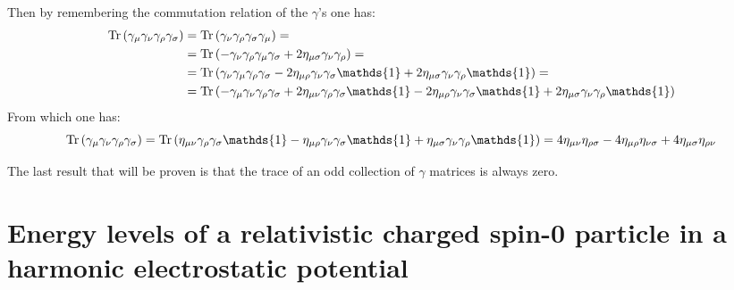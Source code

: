 \documentclass[11pt, oneside]{article}   	%
\begin{document}
Then by remembering the commutation relation of the $\gamma$'s one has:
\begin{align*}
	\Tr \qty( \gamma_\mu \gamma_\nu \gamma_\rho \gamma_\sigma ) &= \Tr \qty( \gamma_\nu \gamma_\rho \gamma_\sigma \gamma_\mu ) = \\ 
	&= \Tr \qty( -\gamma_{\nu} \gamma_{\rho} \gamma_\mu \gamma_\sigma + 2 \eta_{\mu\sigma} \gamma_\nu \gamma_\rho) = \\
	&= \Tr \qty( \gamma_{\nu} \gamma_\mu \gamma_\rho \gamma_\sigma - 2 \eta_{\mu\rho} \gamma_\nu \gamma_\sigma \mathds{1} + 2 \eta_{\mu\sigma} \gamma_\nu \gamma_\rho \mathds{1} ) = \\
	&= \Tr \qty( -\gamma_\mu \gamma_\nu \gamma_\rho \gamma_\sigma + 2 \eta_{\mu\nu} \gamma_\rho \gamma_\sigma \mathds{1} - 2 \eta_{\mu\rho} \gamma_\nu \gamma_\sigma \mathds{1} + 2 \eta_{\mu\sigma} \gamma_\nu \gamma_\rho \mathds{1}  ) 
\end{align*}
From which one has:
\[
	\Tr \qty( \gamma_\mu \gamma_\nu \gamma_\rho \gamma_\sigma ) = \Tr \qty(\eta_{\mu\nu} \gamma_\rho \gamma_\sigma \mathds{1} - \eta_{\mu\rho} \gamma_\nu \gamma_\sigma \mathds{1} + \eta_{\mu\sigma} \gamma_\nu \gamma_\rho \mathds{1}) = 4\eta_{\mu\nu}\eta_{\rho\sigma} - 4\eta_{\mu\rho}\eta_{\nu\sigma} + 4\eta_{\mu\sigma}\eta_{\rho\nu}
\]

The last result that will be proven is that the trace of an odd collection of $\gamma$ matrices is always zero.

\section{Energy levels of a relativistic charged spin-0 particle in a harmonic electrostatic potential}
\end{document}
